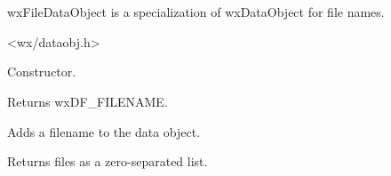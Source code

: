\section{}\label{wxfiledataobject}

wxFileDataObject is a specialization of wxDataObject for file names.




<wx/dataobj.h>




\label{wxfiledataobjectwxfiledataobject}


Constructor.

\label{wxfiledataobjectgetformat}


Returns wxDF\_FILENAME.

\label{wxfiledataobjectaddfile}


Adds a filename to the data object.

\label{wxfiledataobjectgetfiles}


Returns files as a zero-separated list.

